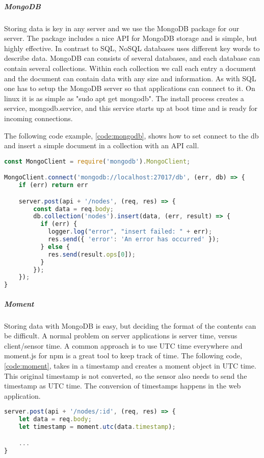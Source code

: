 \documentclass[USenglish]{ifimaster}  %
\begin{document}
\subparagraph{MongoDB} \label{subparagraph:mongodb}
Storing data is key in any server and we use the MongoDB package for our server. The package includes a nice API for MongoDB storage and is simple, but highly effective. In contrast to SQL, NoSQL databases uses different key words to describe data. MongoDB can consists of several databases, and each database can contain several collections. Within each collection we call each entry a document and the document can contain data with any size and information. As with SQL one has to setup the MongoDB server so that applications can connect to it. On linux it is as simple as "sudo apt get mongodb". The install process creates a service, mongodb.service, and this service starts up at boot time and is ready for incoming connections.

The following code example, \vref{code:mongodb}, shows how to set connect to the db and insert a simple document in a collection with an API call.

\begin{lstlisting}[caption={MongoDB setup and insertion},label={code:mongodb},language=JavaScript]
const MongoClient = require('mongodb').MongoClient;

MongoClient.connect('mongodb://localhost:27017/db', (err, db) => {
    if (err) return err

    server.post(api + '/nodes', (req, res) => {
        const data = req.body;
        db.collection('nodes').insert(data, (err, result) => {
          if (err) {
            logger.log("error", "insert failed: " + err);
            res.send({ 'error': 'An error has occurred' });
          } else {
            res.send(result.ops[0]);
          }
        });
    });
}
\end{lstlisting}

\subparagraph{Moment}
Storing data with MongoDB is easy, but deciding the format of the contents can be difficult. A normal problem on server applications is server time, versus client/sensor time. A common approach is to use UTC time everywhere and moment.js for npm is a great tool to keep track of time. The following code, \vref{code:moment}, takes in a timestamp and creates a moment object in UTC time. This original timestamp is not converted, so the sensor also needs to send the timestamp as UTC time. The conversion of timestamps happens in the web application.

\begin{lstlisting}[caption={Simple moment example},label={code:moment},language=JavaScript]
server.post(api + '/nodes/:id', (req, res) => {
    let data = req.body;
    let timestamp = moment.utc(data.timestamp);

    ...
}
\end{lstlisting}
\end{document}
